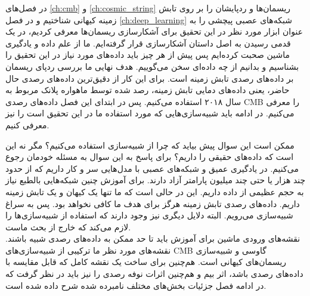 
در فصل‌های
\ref{ch:cmb}
و
\ref{ch:cosmic_string}
ریسمان‌ها و ردپایشان را بر روی تابش زمینه کیهانی  شناختیم و در فصل 
\ref{ch:deep_learning}
شبکه‌های عصبی پیچشی را به عنوان ابزار مورد نظر در این تحقیق برای آشکارسازی ریسمان‌ها معرفی کردیم، در یک قدمی رسیدن به اصل داستان آشکارسازی قرار گرفته‌ایم. ما از علم داده و یادگیری ماشین صحبت کرده‌ایم پس پیش از هر چیز باید داده‌های مورد نیاز در این تحقیق را بشناسیم و بدانیم از چه داده‌ای سخن می‌گوییم. هدف نهایی ما بررسی ردپای ریسمان بر داده‌های رصدی تابش زمینه است. برای این کار از دقیق‌ترین داده‌های رصدی حال حاضر، یعنی داده‌های دمایی تابش زمینه، رصد شده توسط ماهواره پلانک
 مربوط به سال ۲۰۱۸ استفاده می‌کنیم. پس در ابتدای این فصل داده‌های رصدی CMB را معرفی می‌کنیم. در ادامه باید شبیه‌سازی‌هایی که مورد استفاده ما در این تحقیق است را نیز معرفی کنیم.
 \par   
 ممکن است این سوال پیش بیاید که چرا از شبیه‌سازی استفاده می‌کنیم؟ مگر نه این است که داده‌های حقیقی را داریم؟ برای پاسخ به این سوال به مسئله خودمان رجوع می‌کنیم. در یادگیری عمیق و شبکه‌های عصبی با مدل‌هایی سر و کار داریم که از حدود چند هزار یا حتی چند میلیون پارامتر آزاد دارند. برای آموزش چنین شبکه‌هایی بالطبع نیاز به حجم عظیمی از داده داریم. این در حالی است که ما تنها یک کیهان و یک تابش زمینه داریم. داده‌های رصدی تابش زمینه هرگز برای هدف ما کافی نخواهد بود. پس به سراغ شبیه‌سازی می‌رویم. البته دلایل دیگری نیز وجود دارند که استفاده از شبیه‌سازی‌ها را لازم می‌کند که خارج از بحث ماست. \\
 نقشه‌های ورودی ماشین برای آموزش باید تا حد ممکن به داده‌های رصدی شبیه باشند. نقشه‌های مورد نظر ما ترکیبی از شبیه‌سازی‌های CMB گاوسی و شبیه‌سازی ریسمان‌های کیهانی است. هم‌چنین برای ساخت یک نقشه کامل که قابل مقایسه با داده‌های رصدی باشد، اثر بیم و هم‌چنین اثرات نوفه رصدی را نیز باید در نظر گرفت که در ادامه فصل جزئیات بخش‌های مختلف نامبرده شده شرح داده شده است.  
